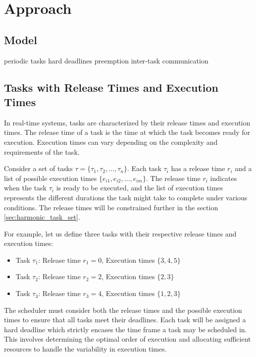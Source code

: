 \chapter{Approach}
\section{Model}
\label{sec:model}
periodic tasks
hard deadlines
preemption
inter-task communication


\section{Tasks with Release Times and Execution Times}
\label{sec:tasks_release_execution}

In real-time systems, tasks are characterized by their release times and execution times.
The release time of a task is the time at which the task becomes ready for execution.
Execution times can vary depending on the complexity and requirements of the task.

Consider a set of tasks \( \tau = \{\tau_1, \tau_2, \ldots, \tau_n\} \).
Each task \( \tau_i \) has a release time \( r_i \) and a list of possible execution times \( \{e_{i1}, e_{i2}, \ldots, e_{im}\} \).
The release time \( r_i \) indicates when the task \( \tau_i \) is ready to be executed, and the list of execution times represents the different durations the task might take to complete under various conditions.
The release times will be constrained further in the section \cref{sec:harmonic_task_set}.

For example, let us define three tasks with their respective release times and execution times:

\begin{itemize}
	\item Task \( \tau_1 \): Release time \( r_1 = 0 \), Execution times \( \{3, 4, 5\} \)
	\item Task \( \tau_2 \): Release time \( r_2 = 2 \), Execution times \( \{2, 3\} \)
	\item Task \( \tau_3 \): Release time \( r_3 = 4 \), Execution times \( \{1, 2, 3\} \)
\end{itemize}

The scheduler must consider both the release times and the possible execution times to ensure that all tasks meet their deadlines.
Each task will be assigned a hard deadline which strictly encases the time frame a task may be scheduled in. 
This involves determining the optimal order of execution and allocating sufficient resources to handle the variability in execution times.

